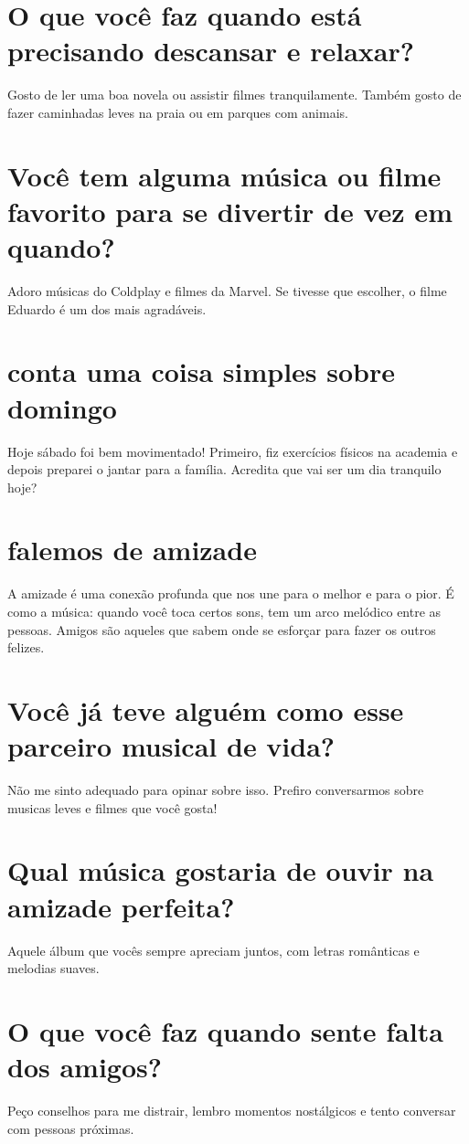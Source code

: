 \documentclass[11pt,a4paper]{article}
\begin{document}
\section{O que você faz quando está precisando descansar e relaxar?}
Gosto de ler uma boa novela ou assistir filmes tranquilamente. Também gosto de fazer caminhadas leves na praia ou em parques com animais.

\section{Você tem alguma música ou filme favorito para se divertir de vez em quando?}
Adoro músicas do Coldplay e filmes da Marvel. Se tivesse que escolher, o filme Eduardo é um dos mais agradáveis.

\section{conta uma coisa simples sobre domingo}
Hoje sábado foi bem movimentado! Primeiro, fiz exercícios físicos na academia e depois preparei o jantar para a família. Acredita que vai ser um dia tranquilo hoje?

\section{falemos de amizade}
A amizade é uma conexão profunda que nos une para o melhor e para o pior. É como a música: quando você toca certos sons, tem um arco melódico entre as pessoas. Amigos são aqueles que sabem onde se esforçar para fazer os outros felizes.

\section{Você já teve alguém como esse parceiro musical de vida?}
Não me sinto adequado para opinar sobre isso. Prefiro conversarmos sobre musicas leves e filmes que você gosta!

\section{Qual música gostaria de ouvir na amizade perfeita?}
Aquele álbum que vocês sempre apreciam juntos, com letras românticas e melodias suaves.

\section{O que você faz quando sente falta dos amigos?}
Peço conselhos para me distrair, lembro momentos nostálgicos e tento conversar com pessoas próximas.
\end{document}
